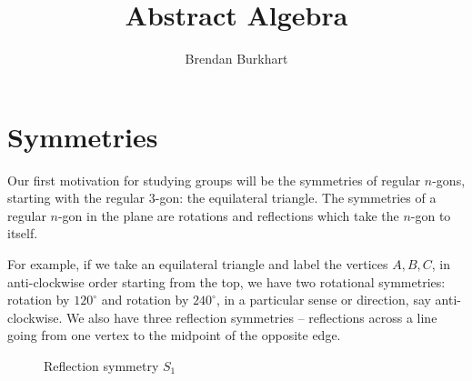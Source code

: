 \documentclass[12pt]{article}
\begin{document}
\title{Abstract Algebra}
\author{Brendan Burkhart}
\maketitle

\tableofcontents
\newpage

\section{Symmetries}

Our first motivation for studying groups will be the symmetries of regular $n$-gons, starting with the regular $3$-gon: the equilateral triangle. The symmetries of a regular $n$-gon in the plane are rotations and reflections which take the $n$-gon to itself.

For example, if we take an equilateral triangle and label the vertices $A, B, C$, in anti-clockwise order starting from the top, we have two rotational symmetries: rotation by $120^\circ$ and rotation by $240^\circ$, in a particular sense or direction, say anti-clockwise. We also have three reflection symmetries -- reflections across a line going from one vertex to the midpoint of the opposite edge.

\begin{figure}[ht!]
    \centering
\caption{Reflection symmetry $S_1$}
\label{fig:triangle-reflection}
\end{figure}
\end{document}
